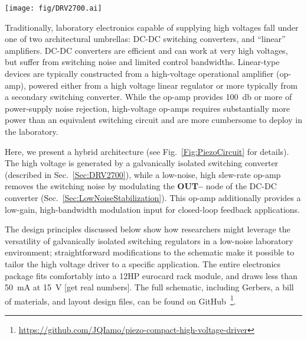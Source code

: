 \documentclass[aip,rsi,reprint]{revtex4-1} %
\begin{document}
\begin{figure*}[t]
\texttt{[image: fig/DRV2700.ai]}
\caption{Schematic of the high voltage stabilization.
The voltage HV is generated using a Texas Instruments DRV2700 high voltage driver in flyback configuration.
A fast, very high slew-rate op-amp senses the output voltage across $R_1$ and $R_2$, and servos it by modulating the node at ``HV floating gnd''.
The $V_{\text{DC}}$ gain is set by $\left(1+R_1/R_2\right)$, while the modulation gain is set by $-R_{\text{mod}}/R_1$.
The capacitor linking the floating ground node to the output allows the op-amp to remove residual switching noise and stabilize the DC output according to the transfer function given in Eq.~(\ref{Eq:PiezoTransfer}). -- Add back in second set of shunt caps!\label{Fig:PiezoCircuit}}
\end{figure*}

Traditionally, laboratory electronics capable of supplying high voltages fall under one of two architectural umbrellas: DC-DC switching converters, and ``linear'' amplifiers.
DC-DC converters are efficient and can work at very high voltages, but suffer from switching noise and limited control bandwidths.
Linear-type devices are typically constructed from a high-voltage operational amplifier (op-amp), powered either from a high voltage linear regulator or more typically from a secondary switching converter.
While the op-amp provides \SI{100}{\decibel} or more of power-supply noise rejection, high-voltage op-amps requires substantially more power than an equivalent switching circuit and are more cumbersome to deploy in the laboratory.

Here, we present a hybrid architecture (see Fig.~\ref{Fig:PiezoCircuit} for details).
The high voltage is generated by a galvanically isolated switching converter (described in Sec.~\ref{Sec:DRV2700}), while a low-noise, high slew-rate op-amp removes the switching noise by modulating the \textbf{OUT--} node of the DC-DC converter (Sec.~\ref{Sec:LowNoiseStabilization}).
This op-amp additionally provides a low-gain, high-bandwidth modulation input for closed-loop feedback applications.

The design principles discussed below show how researchers might leverage the versatility of galvanically isolated switching regulators in a low-noise laboratory environment; straightforward modifications to the schematic make it possible to tailor the high voltage driver to a specific application.
The entire electronics package fits comfortably into a 12HP eurocard rack module, and draws less than \SI{50}{\milli\ampere} at \SI{15}{\volt} [get real numbers].
The full schematic, including Gerbers, a bill of materials, and layout design files, can be found on GitHub~\footnote{\protect\url{https://github.com/JQIamo/piezo-compact-high-voltage-driver}}.
\end{document}
